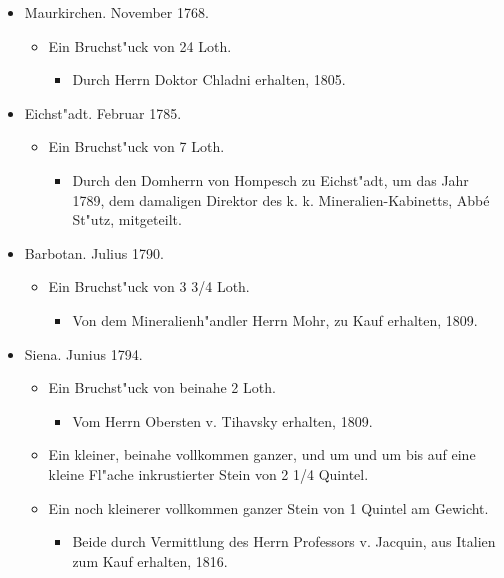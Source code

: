 \documentclass[a4paper, 11pt, oneside, polutonikogreek, german]{article}
\begin{document}
\begin{itemize}
\begin{itemize}
\begin{itemize}
        \end{itemize}
    \end{itemize}
    \item Maurkirchen. November 1768.
    \begin{itemize}
        \item Ein Bruchst"uck von 24 Loth.
        \begin{itemize}
            \item Durch Herrn Doktor Chladni erhalten, 1805.
        \end{itemize}
    \end{itemize}
    \item Eichst"adt. Februar 1785.
    \begin{itemize}
        \item Ein Bruchst"uck von 7 Loth.
        \begin{itemize}
            \item Durch den Domherrn von Hompesch zu Eichst"adt, um das Jahr 1789, dem damaligen Direktor des k. k. Mineralien-Kabinetts, Abbé St"utz, mitgeteilt.
        \end{itemize}
    \end{itemize}
    \item Barbotan. Julius 1790.
    \begin{itemize}
        \item Ein Bruchst"uck von 3 3/4 Loth.
        \begin{itemize}
            \item Von dem Mineralienh"andler Herrn Mohr, zu Kauf erhalten, 1809.
        \end{itemize}
    \end{itemize}
    \item Siena. Junius 1794.
    \begin{itemize}
        \item Ein Bruchst"uck von beinahe 2 Loth.
        \begin{itemize}
            \item Vom Herrn Obersten v. Tihavsky erhalten, 1809.
        \end{itemize}
        \item Ein kleiner, beinahe vollkommen ganzer, und um und um bis auf eine kleine Fl"ache inkrustierter Stein von 2 1/4 Quintel.
        \item Ein noch kleinerer vollkommen ganzer Stein von 1 Quintel am Gewicht.
        \begin{itemize}
            \item Beide durch Vermittlung des Herrn Professors v. Jacquin, aus Italien zum Kauf erhalten, 1816.

\end{itemize}
\end{itemize}
\end{itemize}
\end{document}
